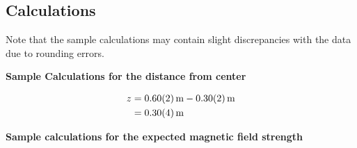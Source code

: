 \pagebreak
\subsection{Calculations}
\begin{center}
    Note that the sample calculations may contain slight discrepancies with the data due to rounding errors.
\end{center}

\begin{center}
    \textbf{Sample Calculations for the distance from center}
\end{center}
\begin{align*}
    z&=\SI{0.60 \pm 0.02}{\metre}-\SI{0.30\pm0.02}{\metre}\\
    &=\SI{0.30 \pm 0.04}{\metre}
\end{align*}

\vspace{2mm}
\begin{center}
    \textbf{Sample calculations for the expected magnetic field strength}
\end{center}

